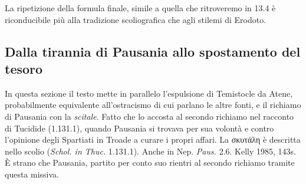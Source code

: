 {            La ripetizione della formula finale, simile a quella che ritroveremo in 13.4 è riconducibile più alla tradizione scoliografica che agli stilemi di Erodoto. 
          \subsection*{Dalla tirannia di Pausania allo spostamento del tesoro}\label{bkm:RefHeading690901501267828}
            In questa sezione il testo mette in parallelo l'espulsione di Temistocle da Atene, probabilmente equivalente all'ostracismo di cui parlano le altre fonti, e il richiamo di Pausania  con la \emph{scitale}. Fatto che lo accosta al secondo richiamo nel racconto di Tucidide (1.131.1), quando Pausania  si trovava per sua volontà e contro l'opinione degli Spartiati in Troade a curare i propri affari. La \textgreek{σκυτάλη} è descritta nello scolio (\emph{Schol. in Thuc.} 1.131.1). Anche in Nep. \emph{Paus.} 2.6. Kelly 1985, 143s. È strano che Pausania, partito per conto suo  rientri al secondo richiamo tramite questa missiva.
}

